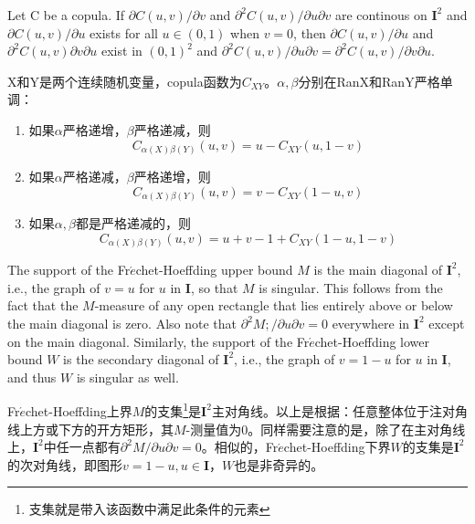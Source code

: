 \begin{theorem}
    Let C be a copula. If $\partial C(u,v)/\partial v$ and $\partial^2C(u,v)/\partial u\partial v$ are continous on $\mathbf{I}^2$ and $\partial C(u,v)/\partial u$ exists for all $u \in (0,1)$ when $v = 0$, then $\partial C(u,v)/\partial u$ and $\partial^2C(u,v)\partial v\partial u$ exist in $(0,1)^2$ and $\partial^2C(u,v)/\partial u\partial v = \partial^2C(u,v)/\partial v \partial u$.
    \label{thr-2.2.8}
\end{theorem}



\begin{theorem}
    X和Y是两个连续随机变量，copula函数为$C_{XY}$。$\alpha,\beta$分别在RanX和RanY严格单调：
    \begin{enumerate}
        \item 如果$\alpha$严格递增，$\beta$严格递减，则
            \begin{equation*}
                C_{\alpha(X)\beta(Y)}(u,v) = u- C_{XY}(u,1-v)
            \end{equation*}
        \item 如果$\alpha$严格递减，$\beta$严格递增，则
            \begin{equation*}
                 C_{\alpha(X)\beta(Y)}(u,v) = v- C_{XY}(1-u,v)
            \end{equation*}
        \item 如果$\alpha,\beta$都是严格递减的，则
            \begin{equation*}
                C_{\alpha(X)\beta(Y)}(u,v) = u+v-1+C_{XY}(1-u,1-v)
            \end{equation*}
    \end{enumerate}
    \label{thr2.4.4}
\end{theorem}

\begin{example}
    The support of the Fr$\acute{e}$chet-Hoeffding upper bound $M$ is the main diagonal of $\mathbf{I}^2$, i.e., the graph of $v = u$ for $u$ in $\mathbf{I}$, so that $M$ is singular. This follows from the fact that the $M$-measure of any open rectangle that lies entirely above or below the main diagonal is zero. Also note that $\partial^2M;/\partial u\partial v=0$ everywhere in $\mathbf{I}^2$ except on the main diagonal. Similarly, the support of the Fr$\acute{e}$chet-Hoeffding lower bound $W$ is the secondary diagonal of $\mathbf{I}^2$, i.e., the graph of $v = 1-u$ for $u$ in $\mathbf{I}$, and thus $W$ is singular as well.

    Fr$\acute{e}$chet-Hoeffding上界$M$的支集\footnote{支集就是带入该函数中满足此条件的元素}是$\mathbf{I}^2$主对角线。以上是根据：任意整体位于注对角线上方或下方的开方矩形，其$M$-测量值为0。同样需要注意的是，除了在主对角线上，$\mathbf{I}^2$中任一点都有$\partial^2M/\partial u\partial v=0$。相似的，Fr$\acute{e}$chet-Hoeffding下界$W$的支集是$\mathbf{I}^2$的次对角线，即图形$v = 1-u, u\in \mathbf{I}$，$W$也是非奇异的。
    \label{exp2.11}
\end{example}


